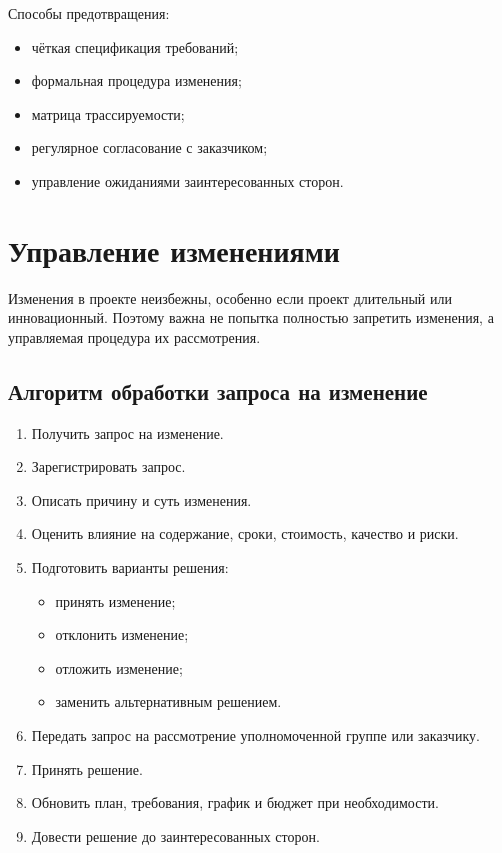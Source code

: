 \documentclass[12pt,a4paper]{article}
\begin{document}
Способы предотвращения:
\begin{itemize}
    \item чёткая спецификация требований;
    \item формальная процедура изменения;
    \item матрица трассируемости;
    \item регулярное согласование с заказчиком;
    \item управление ожиданиями заинтересованных сторон.
\end{itemize}

\section{Управление изменениями}

Изменения в проекте неизбежны, особенно если проект длительный или инновационный. Поэтому важна не попытка полностью запретить изменения, а управляемая процедура их рассмотрения.

\subsection{Алгоритм обработки запроса на изменение}

\begin{enumerate}
    \item Получить запрос на изменение.
    \item Зарегистрировать запрос.
    \item Описать причину и суть изменения.
    \item Оценить влияние на содержание, сроки, стоимость, качество и риски.
    \item Подготовить варианты решения:
    \begin{itemize}
        \item принять изменение;
        \item отклонить изменение;
        \item отложить изменение;
        \item заменить альтернативным решением.
    \end{itemize}
    \item Передать запрос на рассмотрение уполномоченной группе или заказчику.
    \item Принять решение.
    \item Обновить план, требования, график и бюджет при необходимости.
    \item Довести решение до заинтересованных сторон.
\end{enumerate}
\end{document}

